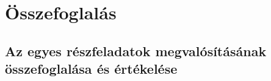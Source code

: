\chapter{Összefoglalás}
\thispagestyle{fancy}
\pagestyle{fancy}


\section{Az egyes részfeladatok megvalósításának összefoglalása és értékelése}

